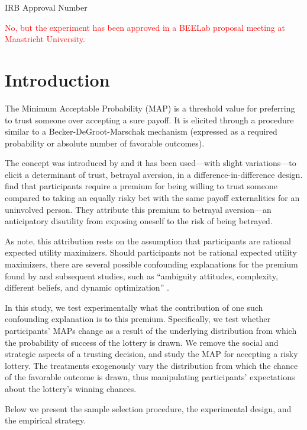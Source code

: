         IRB Approval Number
        
\textcolor{red}{No, but the experiment has been approved in a BEELab proposal meeting at Maastricht University.}





\section{Introduction}
The Minimum Acceptable Probability (MAP) is a threshold value for preferring to trust someone over accepting a sure payoff.
It is elicited through a procedure similar to a Becker-DeGroot-Marschak mechanism (expressed as a required probability or absolute number of favorable outcomes).

The concept was introduced by \cite{Bohnet2004} and it has been used—with slight variations—to elicit a determinant of trust, betrayal aversion, in a difference-in-difference design.
\cite{Bohnet2004} find that participants require a premium for being willing to trust someone compared to taking an equally risky bet with the same payoff externalities for an uninvolved person.
They attribute this premium to betrayal aversion---an anticipatory disutility from exposing oneself to the risk of being betrayed.

As \cite{Li2020a} note, this attribution rests on the assumption that participants are rational expected utility maximizers.
Should participants not be rational expected utility maximizers, there are several possible confounding explanations for the premium found by \cite{Bohnet2004} and subsequent studies, such as ``ambiguity attitudes, complexity, different beliefs, and dynamic optimization'' \citep[p.~275]{Li2020a}.

In this study, we test experimentally what the contribution of one such confounding explanation is to this premium.
Specifically, we test whether participants' MAPs change as a result of the underlying distribution from which the probability of success of the lottery is drawn.
We remove the social and strategic aspects of a trusting decision, and study the MAP for accepting a risky lottery.
The treatments exogenously vary the distribution from which the chance of the favorable outcome is drawn, thus manipulating participants’ expectations about the lottery’s winning chances.


Below we present the sample selection procedure, the experimental design, and the empirical strategy.




